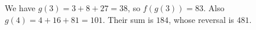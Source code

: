 We have $g(3)=3+8+27=38$, so $f(g(3))=83$. Also $g(4)=4+16+81=101$. Their sum is $184$, whose reversal is $\boxed{481}$.
